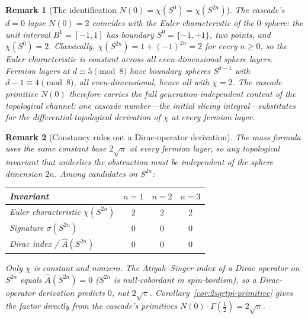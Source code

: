 \documentclass[12pt,a4paper]{article}
\newtheorem*{remark}{Remark}
\begin{document}
\begin{remark}[The identification $N(0) = \chi(S^0) = \chi(S^{2n})$]\label{rem:N0-is-chi}
The cascade's $d=0$ lapse $N(0) = 2$ coincides with the Euler characteristic of the $0$-sphere: the unit interval $B^1 = [-1,1]$ has boundary $S^0 = \{-1,+1\}$, two points, and $\chi(S^0) = 2$. Classically, $\chi(S^{2n}) = 1 + (-1)^{2n} = 2$ for every $n\geq 0$, so the Euler characteristic is constant across all even-dimensional sphere layers. Fermion layers at $d\equiv 5\pmod 8$ have boundary spheres $S^{d-1}$ with $d-1\equiv 4\pmod 8$, all even-dimensional, hence all with $\chi = 2$. The cascade primitive $N(0)$ therefore carries the full generation-independent content of the topological channel: one cascade number---the initial slicing integral---substitutes for the differential-topological derivation of $\chi$ at every fermion layer.
\end{remark}

\begin{remark}[Constancy rules out a Dirac-operator derivation]\label{rem:no-dirac-route}
The mass formula uses the \emph{same} constant base $2\sqrt{\pi}$ at every fermion layer, so any topological invariant that underlies the obstruction must be independent of the sphere dimension $2n$. Among candidates on $S^{2n}$:
\begin{center}
\begin{tabular}{lccc}
\hline
Invariant & $n=1$ & $n=2$ & $n=3$ \\
\hline
Euler characteristic $\chi(S^{2n})$ & $2$ & $2$ & $2$ \\
Signature $\sigma(S^{2n})$ & $0$ & $0$ & $0$ \\
Dirac index / $\hat A(S^{2n})$ & $0$ & $0$ & $0$ \\
\hline
\end{tabular}
\end{center}
Only $\chi$ is constant and nonzero. The Atiyah--Singer index of a Dirac operator on $S^{2n}$ equals $\hat A(S^{2n})=0$ ($S^{2n}$ is null-cobordant in spin-bordism), so a Dirac-operator derivation predicts $0$, not $2\sqrt{\pi}$. Corollary~\ref{cor:2sqrtpi-primitive} gives the factor directly from the cascade's primitives $N(0)\cdot\Gamma(\tfrac{1}{2})=2\sqrt{\pi}$.
\end{remark}
\end{document}
